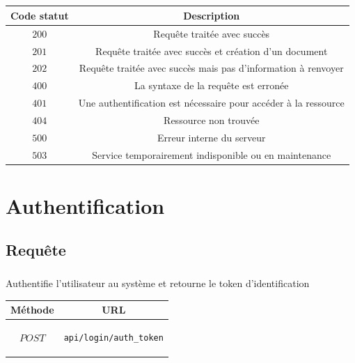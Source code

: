\documentclass[titlepage]{report}
\begin{document}
\paragraph{}

\begin{center}
	\begin{tabular}{|c|c|}
		\hline
		Code statut & Description \\
		\hline \hline
		$ 200 $ & Requête traitée avec succès \\
		\hline 
		$ 201 $ & Requête traitée avec succès et création d'un document \\	
		\hline 
		$ 202 $ & Requête traitée avec succès mais pas d'information à renvoyer \\
		\hline \hline 
		$ 400 $ & La syntaxe de la requête est erronée \\	
		\hline 
		$ 401 $ & Une authentification est nécessaire pour accéder à la ressource \\	
		\hline
		$ 404 $ & Ressource non trouvée \\
		\hline \hline
		$ 500 $ & Erreur interne du serveur \\
		\hline
		$ 503 $ & Service temporairement indisponible ou en maintenance \\ 	
		\hline
	\end{tabular}
\end{center}

\chapter{Authentification}

\section{Requête}

\paragraph{} Authentifie l'utilisateur au système et retourne le token d'identification

\begin{center}
	\begin{tabular}{|c|c|}
		\hline
		Méthode & URL \\
		\hline
		$ POST $ 
		&
		\begin{lstlisting}
api/login/auth_token
		\end{lstlisting} 
		\\ \hline
	\end{tabular}
\end{center}
\end{document}
